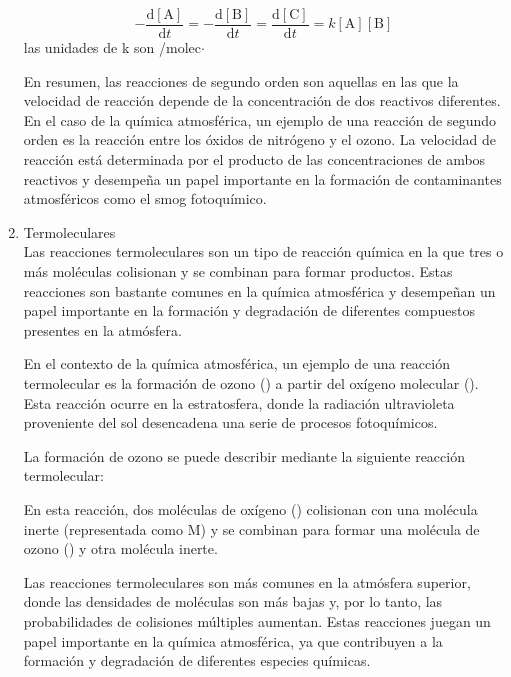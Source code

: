 \begin{enumerate}
 \begin{equation*}
	-\frac{\mathrm{d}[\textrm{A}]}{\mathrm{d}t}=-\frac{\mathrm{d}[\textrm{B}]}{\mathrm{d}t}=\frac{\mathrm{d}[\textrm{C}]}{\mathrm{d}t}=k[\textrm{A}][\textrm{B}]
	\end{equation*}
	las unidades de k son {\centi\cubic\metre}/{molec$\cdot $\second}
	
En resumen, las reacciones de segundo orden son aquellas en las que la velocidad de reacción depende de la concentración de dos reactivos diferentes. En el caso de la química atmosférica, un ejemplo de una reacción de segundo orden es la reacción entre los óxidos de nitrógeno y el ozono. La velocidad de reacción está determinada por el producto de las concentraciones de ambos reactivos y desempeña un papel importante en la formación de contaminantes atmosféricos como el smog fotoquímico.

\item Termoleculares \\
Las reacciones termoleculares son un tipo de reacción química en la que tres o más moléculas colisionan y se combinan para formar productos. Estas reacciones son bastante comunes en la química atmosférica y desempeñan un papel importante en la formación y degradación de diferentes compuestos presentes en la atmósfera.

En el contexto de la química atmosférica, un ejemplo de una reacción termolecular es la formación de ozono () a partir del oxígeno molecular (). Esta reacción ocurre en la estratosfera, donde la radiación ultravioleta proveniente del sol desencadena una serie de procesos fotoquímicos.

La formación de ozono se puede describir mediante la siguiente reacción termolecular:


En esta reacción, dos moléculas de oxígeno () colisionan con una molécula inerte (representada como M) y se combinan para formar una molécula de ozono () y otra molécula inerte.

Las reacciones termoleculares son más comunes en la atmósfera superior, donde las densidades de moléculas son más bajas y, por lo tanto, las probabilidades de colisiones múltiples aumentan. Estas reacciones juegan un papel importante en la química atmosférica, ya que contribuyen a la formación y degradación de diferentes especies químicas.


\end{enumerate}
